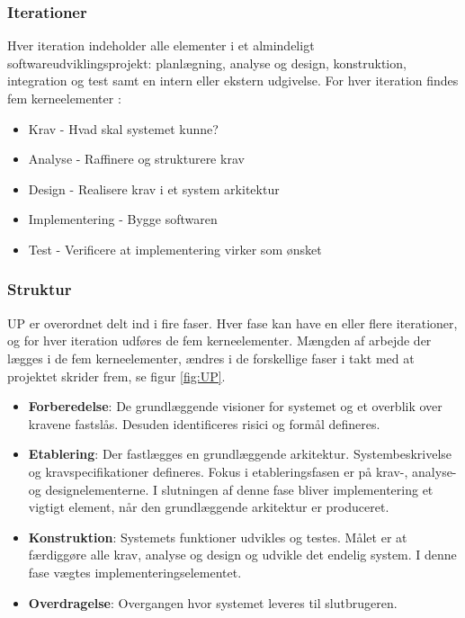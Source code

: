 \subsubsection{Iterationer}
Hver iteration indeholder alle elementer i et almindeligt softwareudviklingsprojekt: planlægning, analyse og design, konstruktion, integration og test samt en intern eller ekstern udgivelse. For hver iteration findes fem kerneelementer \citep{Arlow2002}:
\begin{itemize}
    \item Krav - Hvad skal systemet kunne?
    \item Analyse - Raffinere og strukturere krav
    \item Design - Realisere krav i et system arkitektur
    \item Implementering - Bygge softwaren
    \item Test - Verificere at implementering virker som ønsket 
\end{itemize}

\subsubsection{Struktur}
UP er overordnet delt ind i fire faser. Hver fase kan have en eller flere iterationer, og for hver iteration udføres de fem kerneelementer. Mængden af arbejde der lægges i de fem kerneelementer, ændres i de forskellige faser i takt med at projektet skrider frem, se figur \ref{fig:UP}. \citep{Arlow2002}
\begin{itemize}
    \item \textbf{Forberedelse}: De grundlæggende visioner for systemet og et overblik over kravene fastslås. Desuden identificeres risici og formål defineres. 
    \item \textbf{Etablering}: Der fastlægges en grundlæggende arkitektur. Systembeskrivelse og kravspecifikationer defineres. Fokus i etableringsfasen er på krav-, analyse- og designelementerne. I slutningen af denne fase bliver implementering et vigtigt element, når den grundlæggende arkitektur er produceret.  
    \item \textbf{Konstruktion}: Systemets funktioner udvikles og testes. Målet er at færdiggøre alle krav, analyse og design og udvikle det endelig system. I denne fase vægtes implementeringselementet. 
    \item \textbf{Overdragelse}: Overgangen hvor systemet leveres til slutbrugeren. 
\end{itemize}

